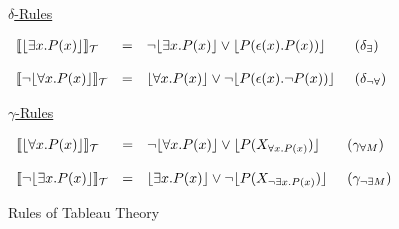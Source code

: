 \begin{figure}[htbp]
{\underline{$\delta$-Rules}
\begin{center}
$\begin{array}{lll@{\hspace{0.5cm}}l}
\llbracket\lfloor\exists{}x.P(x)\rfloor{}\rrbracket_\mathcal{T} & = &
\neg{}\lfloor\exists{}x.P(x)\rfloor\lor\lfloor{}P(\epsilon(x).P(x))\rfloor &
(\delta_\exists)\\\\

\llbracket\neg\lfloor\forall{}x.P(x)\rfloor{}\rrbracket_\mathcal{T} & = &
\lfloor\forall{}x.P(x)\rfloor\lor\neg\lfloor{}P(\epsilon(x).\neg{}P(x))\rfloor &
(\delta_{\neg\forall})
\end{array}$
\end{center}

\underline{$\gamma$-Rules}
\begin{center}
$\begin{array}{lll@{\hspace{0.5cm}}l}
\llbracket\lfloor\forall{}x.P(x)\rfloor{}\rrbracket_\mathcal{T} & = &
\neg\lfloor\forall{}x.P(x)\rfloor\lor\lfloor{}P(X_{\forall{}x.P(x)})\rfloor &
(\gamma_{\forall{}M})\\\\

\llbracket\neg\lfloor\exists{}x.P(x)\rfloor{}\rrbracket_\mathcal{T} & = &
\lfloor\exists{}x.P(x)\rfloor\lor
\neg\lfloor{}P(X_{\neg\exists{}x.P(x)})\rfloor &
(\gamma_{\neg\exists{}M})
\end{array}$
\end{center}}
\caption{Rules of Tableau Theory}
\label{fig:tabth}
\end{figure}

